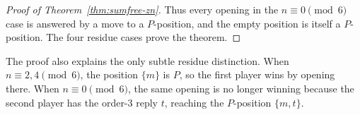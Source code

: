 \begin{proof}[Proof of Theorem~\ref{thm:sumfree-zn}]
Thus every opening in the $n\equiv 0\pmod 6$ case is answered by a move to a $P$-position,
and the empty position is itself a $P$-position. The four residue cases prove the theorem.
\end{proof}

The proof also explains the only subtle residue distinction. When $n\equiv 2,4\pmod 6$,
the position $\{m\}$ is $P$, so the first player wins by opening there. When
$n\equiv 0\pmod 6$, the same opening is no longer winning because the second player has
the order-$3$ reply $t$, reaching the $P$-position $\{m,t\}$.
